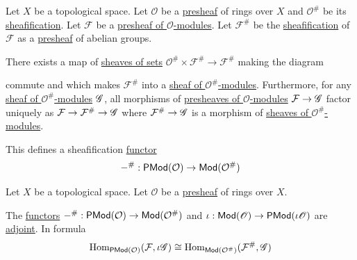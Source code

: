 \documentclass[../../../main]{subfiles}
\begin{document}
\begin{proposition}
  Let \(X\) be a topological space.
  Let \(\mathcal{O}\) be a \hyperref[def:presheaf]{presheaf} of rings over \(X\) and \(\mathcal{O}^{\#}\) be its \hyperref[def:sheafification]{sheafification}.
  Let \(\mathcal{F}\) be a \hyperref[def:presheaf-of-modules]{presheaf of \(\mathcal{O}\)-modules}.
  Let \(\mathcal{F}^{\#}\) be the \hyperref[def:sheafification]{sheafification} of \(\mathcal{F}\) as a \hyperref[def:presheaf]{presheaf} of abelian groups.

  There exists a map of \hyperref[def:set-valued-sheaf]{sheaves of sets} \(\mathcal{O}^{\#} \times \mathcal{F}^{\#} \to \mathcal{F}^{\#}\) making the diagram
  \begin{center}
  \end{center}
  commute and which makes \(\mathcal{F}^{\#}\) into a \hyperref[def:sheaf-of-modules]{sheaf of \(\mathcal{O}^{\#}\)-modules}.
  Furthermore, for any \hyperref[def:sheaf-of-modules]{sheaf of \(\mathcal{O}^{\#}\)-modules} \(\mathscr{G}\), all morphisms of \hyperref[def:presheaf-of-modules]{presheaves of \(\mathcal{O}\)-modules} \(\mathcal{F} \to \mathscr{G}\) factor uniquely as \(\mathcal{F} \to \mathcal{F}^{\#} \to \mathscr{G}\) where \(\mathcal{F}^{\#} \to \mathscr{G}\) is a morphism of \hyperref[def:sheaf-of-modules]{sheaves of \(\mathcal{O}^{\#}\)-modules}.

  This defines a sheafification \hyperref[def:functor]{functor}
  \begin{equation*}
    -^{\#}: \mathsf{PMod}(\mathcal{O}) \to \mathsf{Mod}(\mathcal{O}^{\#})
  \end{equation*}
\end{proposition}

\begin{lemma}
  Let \(X\) be a topological space.
  Let \(\mathcal{O}\) be a \hyperref[def:presheaf]{presheaf} of rings over \(X\).

  The \hyperref[def:functor]{functors} \(-^{\#}: \mathsf{PMod}(\mathcal{O}) \to \mathsf{Mod}(\mathcal{O}^{\#})\) and \(\iota: \mathsf{Mod}(\mathscr{O}) \to \mathsf{PMod}(\iota\mathscr{O})\) are \hyperref[def:adjoint-functors]{adjoint}.
  In formula
  \begin{equation*}
    \operatorname{Hom}_{\mathsf{PMod}(\mathcal{O})} (\mathcal{F}, \iota\mathscr{G}) \cong \operatorname{Hom}_{\mathsf{Mod}(\mathcal{O}^{\#})}(\mathcal{F}^{\#}, \mathscr{G})
  \end{equation*}
\end{lemma}
\end{document}
